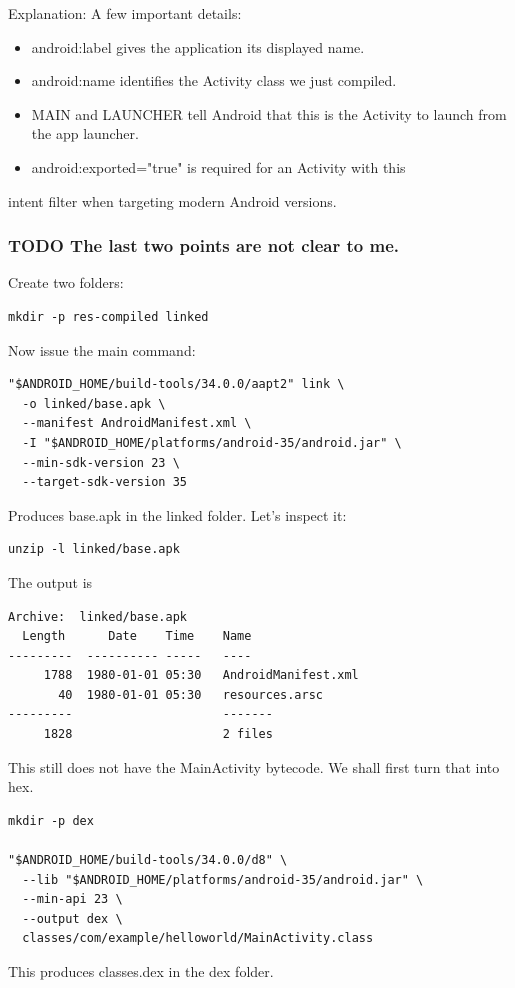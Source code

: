 \documentclass[11pt]{article}
\begin{document}
Explanation: 
A few important details:

\begin{itemize}
\item android:label gives the application its displayed name.

\item android:name identifies the Activity class we just compiled.

\item MAIN and LAUNCHER tell Android that this is the Activity to launch from the app launcher.

\item android:exported="true" is required for an Activity with this
\end{itemize}
intent filter when targeting modern Android versions. 

\subsubsection{{\bfseries\sffamily TODO} The last two points are not clear to me.}
\label{sec:orgfd29631}

Create two folders:
\begin{verbatim}
mkdir -p res-compiled linked
\end{verbatim}

Now issue the main command:
\begin{verbatim}
"$ANDROID_HOME/build-tools/34.0.0/aapt2" link \
  -o linked/base.apk \
  --manifest AndroidManifest.xml \
  -I "$ANDROID_HOME/platforms/android-35/android.jar" \
  --min-sdk-version 23 \
  --target-sdk-version 35
\end{verbatim}

Produces base.apk in the linked folder. Let's inspect it:
\begin{verbatim}
unzip -l linked/base.apk
\end{verbatim}
The output is
\begin{verbatim}
Archive:  linked/base.apk
  Length      Date    Time    Name
---------  ---------- -----   ----
     1788  1980-01-01 05:30   AndroidManifest.xml
       40  1980-01-01 05:30   resources.arsc
---------                     -------
     1828                     2 files

\end{verbatim}
This still does not have the MainActivity bytecode. We shall
first turn that into hex.
\begin{verbatim}
mkdir -p dex

"$ANDROID_HOME/build-tools/34.0.0/d8" \
  --lib "$ANDROID_HOME/platforms/android-35/android.jar" \
  --min-api 23 \
  --output dex \
  classes/com/example/helloworld/MainActivity.class
\end{verbatim}
This produces classes.dex in the dex folder.
\end{document}
